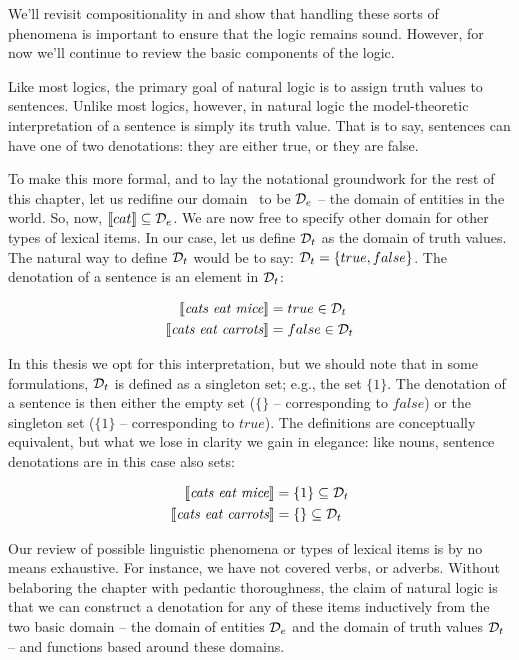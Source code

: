 We'll revisit compositionality in  and show that handling these sorts
  of phenomena is important to ensure that the logic remains sound.
However, for now we'll continue to review the basic components of the logic.


Like most logics, the primary goal of natural logic is to assign truth
  values to sentences.
Unlike most logics, however, in natural logic the model-theoretic interpretation of
  a sentence is simply its truth value.
That is to say, sentences can have one of two denotations: they are either true, or they
  are false.

To make this more formal, and to lay the notational groundwork for the rest of this chapter,
  let us redifine our domain \sD\ to be $\mathcal{D}_e$ -- the domain of entities in the world.
So, now, $\llbracket cat \rrbracket \subseteq \mathcal{D}_e$.
We are now free to specify other domain for other types of lexical items.
In our case, let us define $\mathcal{D}_t$ as the domain of truth values.
The natural way to define $\mathcal{D}_t$ would be to say: $\mathcal{D}_t = \{true, false\}$.
The denotation of a sentence is an element in $\mathcal{D}_t$:

\begin{align*}
\llbracket\textit{cats eat mice}\rrbracket &= true \in \mathcal{D}_t \\
\llbracket\textit{cats eat carrots}\rrbracket &= false \in \mathcal{D}_t
\end{align*}

In this thesis we opt for this interpretation, but we should note that
  in some formulations, $\mathcal{D}_t$ is defined as a singleton set; e.g., the set $\{1\}$.
The denotation of a sentence is then either the empty set ($\{\}$ -- corresponding to $false$)
  or the singleton set ($\{1\}$ -- corresponding to $true$).
The definitions are conceptually equivalent, but what we lose in clarity we gain in elegance:
  like nouns, sentence denotations are in this case also sets:


\begin{align*}
\llbracket\textit{cats eat mice}\rrbracket &= \{1\} \subseteq \mathcal{D}_t \\
\llbracket\textit{cats eat carrots}\rrbracket &= \{\} \subseteq \mathcal{D}_t
\end{align*}



Our review of possible linguistic phenomena or types of lexical items is by 
  no means exhaustive.
For instance, we have not covered verbs, or adverbs.
Without belaboring the chapter with pedantic thoroughness, the claim of natural logic
  is that we can construct a denotation for any of these items inductively
  from the two basic domain -- 
  the domain of entities $\mathcal{D}_e$ and the domain of truth values $\mathcal{D}_t$ --
  and functions based around these domains.

